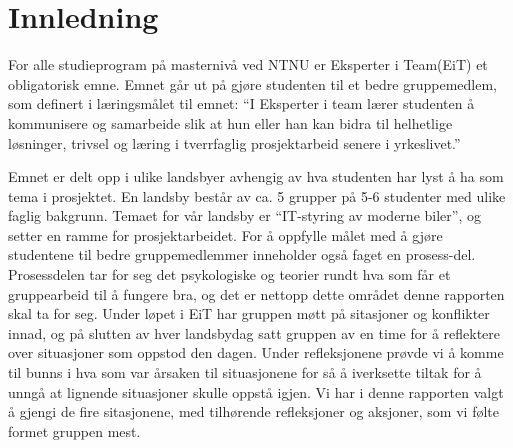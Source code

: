 \chapter{Innledning}

For alle studieprogram på masternivå ved NTNU er Eksperter i Team(EiT) et obligatorisk emne. Emnet går ut på gjøre 
studenten til et bedre gruppemedlem, som definert i læringsmålet til emnet: ``I Eksperter i team lærer studenten å 
kommunisere og samarbeide slik at hun eller han kan
bidra til helhetlige løsninger, trivsel og læring i tverrfaglig prosjektarbeid senere i yrkeslivet.'' \cite{laeringsmaal}

Emnet er delt opp i ulike landsbyer avhengig av hva studenten har lyst å ha som tema i prosjektet. En landsby består 
av ca. 5 grupper på 5-6 studenter med ulike faglig bakgrunn. Temaet for vår landsby er ``IT-styring av moderne 
biler'', og setter en ramme for prosjektarbeidet. \cite{tdt4856} For å oppfylle målet med å gjøre studentene til bedre gruppemedlemmer 
inneholder også faget en prosess-del. Prosessdelen tar for seg det psykologiske og teorier rundt hva som får 
et gruppearbeid til å fungere bra, og det er nettopp dette området denne rapporten skal ta for seg. 
Under løpet i EiT har gruppen møtt på sitasjoner og konflikter innad, og på slutten av 
hver landsbydag satt gruppen av en time for å reflektere over situasjoner som oppstod den dagen. Under refleksjonene 
prøvde vi å komme til bunns i hva som var årsaken til situasjonene for så å iverksette tiltak for å unngå 
at lignende situasjoner skulle oppstå igjen. Vi har i denne rapporten valgt å gjengi de fire sitasjonene, med tilhørende 
refleksjoner og aksjoner, som vi følte formet gruppen mest.



